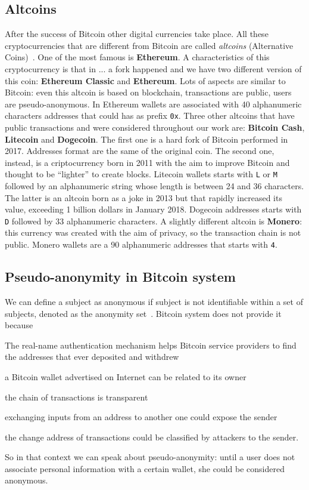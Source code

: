 \subsection{Altcoins}
After the success of Bitcoin other digital currencies take place. All these
cryptocurrencies that are different from Bitcoin are called \textit{altcoins}
(Alternative Coins)~\cite{bitcoinbeyond}. One of the most famous is 
\textbf{Ethereum}. A characteristics of this cryptocurrency is that in ... a
fork happened and we have two different version of this coin: \textbf{Ethereum
Classic} and \textbf{Ethereum}. Lots of aspects are similar to Bitcoin: even
this altcoin is based on blockchain, transactions are public, users are
pseudo-anonymous. In Ethereum wallets are associated with 40 alphanumeric
characters addresses that could has as prefix \texttt{0x}. Three other altcoins
that have public transactions and were considered throughout our work are: 
\textbf{Bitcoin Cash}, \textbf{Litecoin} and \textbf{Dogecoin}. The first one
is a hard fork of Bitcoin performed in 2017. Addresses format are the same of
the original coin. The second one, instead, is a criptocurrency born in 2011
with the aim to improve Bitcoin and thought to be ``lighter'' to create blocks.
Litecoin wallets starts with \texttt{L} or \texttt{M} followed by an
alphanumeric string whose length is between 24 and 36 characters. The latter
is an altcoin born as a joke in 2013 but that rapidly increased its value,
exceeding 1 billion dollars in January 2018. Dogecoin addresses starts with
\texttt{D} followed by 33 alphanumeric characters. A slightly different altcoin
is \textbf{Monero}: this currency was created with the aim of privacy, so the
transaction chain is not public. Monero wallets are a 90 alphanumeric addresses
that starts with \texttt{4}.


\subsection{Pseudo-anonymity in Bitcoin system}
We can define a subject as anonymous if subject is not identifiable within a
set of subjects, denoted as the anonymity set~\cite{terminology}. Bitcoin system
does not provide it because~\cite{deanon}
\begin{enumerate*}[label=\roman*),itemjoin={,\quad}]
\item The real-name authentication mechanism helps Bitcoin service providers to
find the addresses that ever deposited and withdrew
\item a Bitcoin wallet advertised on Internet can be related to its owner
\item the chain of transactions is transparent
\item exchanging inputs from an address to another one could expose the sender
\item the change address of transactions could be classified by attackers to
the sender.
\end{enumerate*}
So in that context we can speak about pseudo-anonymity: until a user does not
associate personal information with a certain wallet, she could be considered
anonymous.